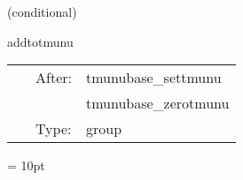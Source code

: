 \vspace{5mm}

   (conditional) 

\hspace{5mm} addtotmunu 

\hspace{5mm}{\it add to the stress-energy tensor here } 


\hspace{5mm}

 \begin{tabular*}{160mm}{cll} 
~ & After:  & tmunubase\_settmunu \\ 
~& ~ &tmunubase\_zerotmunu\\ 
~ & Type:  & group \\ 
\end{tabular*} 



\vspace{5mm}\parskip = 10pt 
